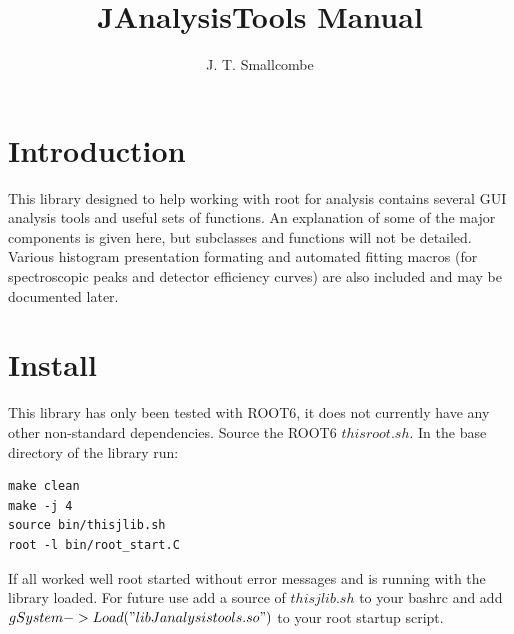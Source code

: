 \documentclass[a4paper,10pt]{article}
\title{JAnalysisTools Manual}
\author{J. T. Smallcombe}
\begin{document}
\maketitle
\tableofcontents

\section{Introduction}
This library designed to help working with root for analysis contains several GUI analysis tools and useful sets of functions. An explanation of some of the major components is given here, but subclasses and functions will not be detailed.
Various histogram presentation formating and automated fitting macros (for spectroscopic peaks and detector efficiency curves) are also included and may be documented later. 

\section{Install}
This library has only been tested with ROOT6, it does not currently have any other non-standard dependencies.
Source the ROOT6 $thisroot.sh$.
In the base directory of the library run:
\lstset{language=bash}
\begin{lstlisting}
make clean
make -j 4
source bin/thisjlib.sh
root -l bin/root_start.C
\end{lstlisting}
If all worked well root started without error messages and is running with the library loaded.
For future use add a source of $thisjlib.sh$ to your bashrc and add $gSystem->Load("libJanalysistools.so")$ to your root startup script.
\end{document}
